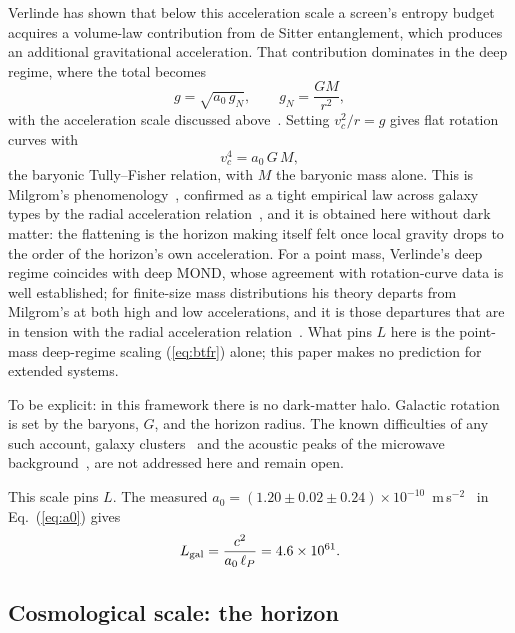 \documentclass[aps,prd,twocolumn,superscriptaddress,nofootinbib,showkeys]{revtex4-2}
\begin{document}
Verlinde has shown that below this acceleration scale a screen's entropy budget acquires a volume-law contribution from de Sitter entanglement, which produces an additional gravitational acceleration. That contribution dominates in the deep regime, where the total becomes
\begin{equation}
g = \sqrt{a_0\,g_N},\qquad g_N = \frac{GM}{r^2},
\label{eq:deepmond}
\end{equation}
with the acceleration scale discussed above~\cite{verlinde2017}. Setting $v_c^2/r = g$ gives flat rotation curves with
\begin{equation}
v_c^4 = a_0\,G\,M ,
\label{eq:btfr}
\end{equation}
the baryonic Tully--Fisher relation, with $M$ the baryonic mass alone. This is Milgrom's phenomenology~\cite{milgrom1983}, confirmed as a tight empirical law across galaxy types by the radial acceleration relation~\cite{mcgaugh2016}, and it is obtained here without dark matter: the flattening is the horizon making itself felt once local gravity drops to the order of the horizon's own acceleration. For a point mass, Verlinde's deep regime coincides with deep MOND, whose agreement with rotation-curve data is well established; for finite-size mass distributions his theory departs from Milgrom's at both high and low accelerations, and it is those departures that are in tension with the radial acceleration relation~\cite{lelli2017}. What pins $L$ here is the point-mass deep-regime scaling (\ref{eq:btfr}) alone; this paper makes no prediction for extended systems.

To be explicit: in this framework there is no dark-matter halo. Galactic rotation is set by the baryons, $G$, and the horizon radius. The known difficulties of any such account, galaxy clusters~\cite{clowe2006} and the acoustic peaks of the microwave background~\cite{planck2018}, are not addressed here and remain open.

This scale pins $L$. The measured $a_0 = (1.20\pm0.02\pm0.24)\times10^{-10}$~m\,s$^{-2}$~\cite{mcgaugh2016} in Eq.~(\ref{eq:a0}) gives
\begin{equation}
L_{\rm gal} = \frac{c^2}{a_0\,\ell_P} = 4.6\times10^{61}.
\label{eq:Lgal}
\end{equation}

\subsection{Cosmological scale: the horizon}
\end{document}
